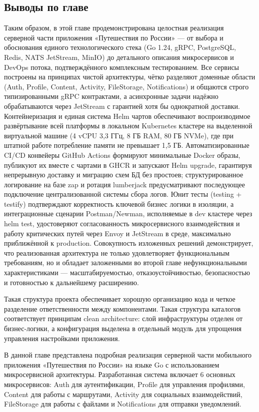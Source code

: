 \subsection*{Выводы по главе}
Таким образом, в этой главе продемонстрирована целостная реализация серверной части приложения «Путешествия по России» — от выбора и обоснования единого технологического стека (Go 1.24, gRPC, PostgreSQL, Redis, NATS JetStream, MinIO) до детального описания микросервисов и DevOps потока, подтверждённого комплексным тестированием. Все сервисы построены на принципах чистой архитектуры, чётко разделяют доменные области (Auth, Profile, Content, Activity, FileStorage, Notifications) и общаются строго типизированными gRPC контрактами, а асинхронные задачи надёжно обрабатываются через JetStream с гарантией хотя бы однократной доставки. Контейнеризация и единая система Helm чартов обеспечивают воспроизводимое развёртывание всей платформы в локальном Kubernetes кластере на выделенной виртуальной машине (4 vCPU 3,3 ГГц, 8 ГБ RAM, 80 ГБ NVMe), где при штатной работе потребление памяти не превышает 1,5 ГБ. Автоматизированные CI/CD конвейеры GitHub Actions формируют минимальные Docker образы, публикуют их вместе с чартами в GHCR и запускают Helm upgrade, гарантируя непрерывную доставку и миграцию схем БД без простоев; структурированное логирование на базе zap и ротация lumberjack предусматривают последующее подключение централизованной системы сбора логов. Юнит тесты (testing + testify) подтверждают корректность ключевой бизнес логики в изоляции, а интеграционные сценарии Postman/Newman, исполняемые в dev кластере через helm test, удостоверяют согласованность микросервисного взаимодействия и работу критических путей через Envoy и JetStream в среде, максимально приближённой к production. Совокупность изложенных решений демонстрирует, что реализованная архитектура не только удовлетворяет функциональным требованиям, но и обладает заложенными во второй главе нефункциональными характеристиками — масштабируемостью, отказоустойчивостью, безопасностью и готовностью к дальнейшему расширению.

Такая структура проекта обеспечивает хорошую организацию кода и четкое разделение ответственности между компонентами. Такая структура каталогов соответствует принципам clean architecture: слой инфраструктуры отделен от бизнес-логики, а конфигурация выделена в отдельный модуль для упрощения управления настройками приложения.

В данной главе представлена подробная реализация серверной части мобильного приложения «Путешествия по России» на языке Go с использованием микросервисной архитектуры. Разработанная система включает 6 основных микросервисов: Auth для аутентификации, Profile для управления профилями, Content для работы с маршрутами, Activity для социальных взаимодействий, FileStorage для работы с файлами и Notifications для отправки уведомлений.
